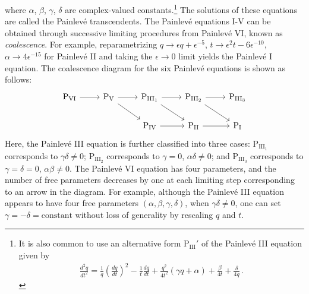 \documentclass[11pt, a4paper]{article}
\theoremstyle{definition}
\begin{document}
where $ \alpha $, $ \beta $, $ \gamma $, $ \delta $ are complex-valued constants.\footnote{\label{footnote:PIII'}It is also common to use an alternative form $ \mathrm{P}_{\mathrm{III}}' $ of the Painlev\'e III equation given by \begin{align*} \frac{d^2q}{dt^2} = \frac{1}{q} \left( \frac{dq}{dt}\right)^2 - \frac{1}{t} \frac{dq}{dt} + \frac{q^2}{4t^2} (\gamma q + \alpha) + \frac{\beta}{4t} + \frac{\delta}{4q} \, . \end{align*}} The solutions of these equations are called the Painlev\'e transcendents. The Painlev\'e equations I-V can be obtained through successive limiting procedures from Painlev\'e VI, known as \emph{coalescence}. For example, reparametrizing $ q\to \epsilon q + \epsilon^{-5} $, $ t \to \epsilon^2t - 6\epsilon^{-10} $, $ \alpha \to 4\epsilon^{-15} $ for Painlev\'e II and taking the $ \epsilon \to 0 $ limit yields the Painlev\'e I equation. The coalescence diagram for the six Painlev\'e equations is shown as follows:
\begin{equation}\label{eq:coalescence}
    \begin{tikzcd}
        \mathrm{P}_{\mathrm{VI}} \arrow{r} & \mathrm{P}_{\mathrm{V}} \arrow{r} \arrow{rd} & \mathrm{P}_{\mathrm{III}_1} \arrow{r} \arrow{rd} & \mathrm{P}_{\mathrm{III}_2} \arrow{r} \arrow{rd} & \mathrm{P}_{\mathrm{III}_3} \\
        & & \mathrm{P}_{\mathrm{IV}} \arrow{r} & \mathrm{P}_{\mathrm{II}} \arrow{r} & \mathrm{P}_{\mathrm{I}}
    \end{tikzcd}
\end{equation}
Here, the Painlev\'e III equation is further classified into three cases: $ \mathrm{P}_{\mathrm{III}_1} $ corresponds to $ \gamma\delta \neq 0 $; $ \mathrm{P}_{\mathrm{III}_2} $ corresponds to $ \gamma=0 $, $ \alpha \delta \neq 0 $; and $ \mathrm{P}_{\mathrm{III}_3} $ corresponds to $ \gamma=\delta=0 $, $ \alpha\beta \neq 0 $. The Painlev\'e VI equation has four parameters, and the number of free parameters decreases by one at each limiting step corresponding to an arrow in the diagram. For example, although the Painlev\'e III equation appears to have four free parameters $ (\alpha,\beta,\gamma,\delta) $, when $ \gamma\delta \neq 0 $, one can set $ \gamma=-\delta=\mathrm{constant} $ without loss of generality by rescaling $ q $ and $ t $.
\end{document}
